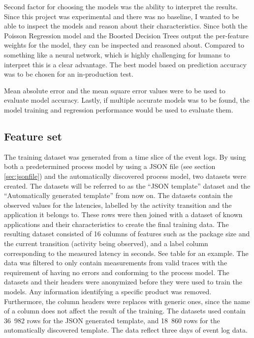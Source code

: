 Second factor for choosing the models was the ability to interpret the results.
Since this project was experimental and there was no baseline, I wanted to be able to inspect the models and reason about their characteristics.
Since both the Poisson Regression model and the Boosted Decision Trees output the per-feature weights for the model, they can be inspected and reasoned about.
Compared to something like a neural network, which is highly challenging for humans to interpret  this is a clear advantage.
The best model based on prediction accuracy was to be chosen for an in-production test.

Mean absolute error and the mean square error values were to be used to evaluate model accuracy.
Lastly, if multiple accurate models was to be found, the model training and regression performance would be used to evaluate them.

\subsection{Feature set}
\label{sec:featureset}

The training dataset was generated from a time slice of the event logs. 
By using both a predetermined process model by using a JSON file (see section \ref{sec:jsonfile}) and the automatically discovered process model, two datasets were created. 
The datasets will be referred to as the ``JSON template'' dataset and the ``Automatically generated template'' from now on.
The datasets contain the observed values for the latencies, labelled by the activity transition and the application it belongs to.
These rows were then joined with a dataset of known applications and their characteristics to create the final training data.
The resulting dataset consisted of 16 columns of features such as the package size and the current transition (activity being observed), and a label column corresponding to the measured latency in seconds. 
See table  for an example.
The data was filtered to only contain measurements from valid traces with the requirement of having no errors and conforming to the process model.
The datasets and their headers were anonymized before they were used to train the models.
Any information identifying a specific product was removed.
Furthermore, the column headers were replaces with generic ones, since the name of a column does not affect the result of the training.
The datasets used contain 36~982 rows for the JSON generated template, and 18~860 rows for the automatically discovered template.
The data reflect three days of event log data.

